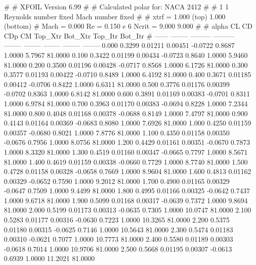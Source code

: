 #  
#       XFOIL         Version 6.99
#  
# Calculated polar for: NACA 2412                                       
#  
# 1 1 Reynolds number fixed          Mach number fixed         
#  
# xtrf =   1.000 (top)        1.000 (bottom)  
# Mach =   0.000     Re =     0.150 e 6     Ncrit =   9.000  9.000
#  
#   alpha    CL        CD       CDp       CM     Top_Xtr  Bot_Xtr  Top_Itr  Bot_Itr
#  ------ -------- --------- --------- -------- -------- -------- -------- --------
   0.000   0.3299   0.01211   0.00451  -0.0722   0.8687   1.0000   5.7967  81.0000
   0.100   0.3422   0.01199   0.00434  -0.0723   0.8640   1.0000   5.9460  81.0000
   0.200   0.3500   0.01196   0.00428  -0.0717   0.8568   1.0000   6.1726  81.0000
   0.300   0.3577   0.01193   0.00422  -0.0710   0.8489   1.0000   6.4192  81.0000
   0.400   0.3671   0.01185   0.00412  -0.0706   0.8422   1.0000   6.6311  81.0000
   0.500   0.3776   0.01176   0.00399  -0.0702   0.8363   1.0000   6.8142  81.0000
   0.600   0.3891   0.01169   0.00383  -0.0701   0.8311   1.0000   6.9784  81.0000
   0.700   0.3963   0.01170   0.00383  -0.0694   0.8228   1.0000   7.2344  81.0000
   0.800   0.4048   0.01168   0.00378  -0.0688   0.8149   1.0000   7.4797  81.0000
   0.900   0.4143   0.01164   0.00369  -0.0683   0.8080   1.0000   7.6926  81.0000
   1.000   0.4250   0.01159   0.00357  -0.0680   0.8021   1.0000   7.8776  81.0000
   1.100   0.4350   0.01158   0.00350  -0.0676   0.7956   1.0000   8.0756  81.0000
   1.200   0.4429   0.01161   0.00351  -0.0670   0.7873   1.0000   8.3320  81.0000
   1.300   0.4519   0.01160   0.00347  -0.0665   0.7797   1.0000   8.5671  81.0000
   1.400   0.4619   0.01159   0.00338  -0.0660   0.7729   1.0000   8.7740  81.0000
   1.500   0.4728   0.01158   0.00328  -0.0658   0.7669   1.0000   8.9604  81.0000
   1.600   0.4813   0.01162   0.00329  -0.0652   0.7590   1.0000   9.2012  81.0000
   1.700   0.4900   0.01165   0.00329  -0.0647   0.7509   1.0000   9.4499  81.0000
   1.800   0.4995   0.01166   0.00325  -0.0642   0.7437   1.0000   9.6718  81.0000
   1.900   0.5099   0.01168   0.00317  -0.0639   0.7372   1.0000   9.8694  81.0000
   2.000   0.5199   0.01173   0.00313  -0.0635   0.7305   1.0000  10.0747  81.0000
   2.100   0.5283   0.01177   0.00316  -0.0630   0.7223   1.0000  10.3265  81.0000
   2.200   0.5375   0.01180   0.00315  -0.0625   0.7146   1.0000  10.5643  81.0000
   2.300   0.5474   0.01183   0.00310  -0.0621   0.7077   1.0000  10.7773  81.0000
   2.400   0.5580   0.01189   0.00303  -0.0618   0.7014   1.0000  10.9706  81.0000
   2.500   0.5668   0.01195   0.00307  -0.0613   0.6939   1.0000  11.2021  81.0000
